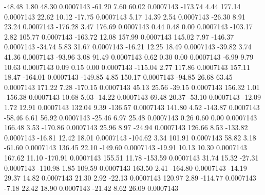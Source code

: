       -48.48        1.80       48.30     0.0007143
      -61.20        7.60       60.02     0.0007143
     -173.74        4.44      177.14     0.0007143
       22.62       10.12      -17.75     0.0007143
        5.17       14.39        2.54     0.0007143
      -26.30        8.91       23.24     0.0007143
     -176.28        3.47      176.69     0.0007143
        0.44        0.48        0.00     0.0007143
     -103.17        2.82      105.77     0.0007143
     -163.72       12.08      157.99     0.0007143
      145.02        7.97     -146.37     0.0007143
      -34.74        5.83       31.67     0.0007143
      -16.21       12.25       18.49     0.0007143
      -39.82        3.74       41.36     0.0007143
      -93.96        3.08       91.49     0.0007143
        0.62        0.30        0.00     0.0007143
       -6.99        9.79       10.63     0.0007143
        0.09        0.15        0.00     0.0007143
     -115.04        2.77      117.86     0.0007143
      157.11       18.47     -164.01     0.0007143
     -149.85        4.85      150.17     0.0007143
      -94.85       26.68       63.45     0.0007143
      171.22        7.28     -170.15     0.0007143
       45.13       25.56      -39.15     0.0007143
      156.32        1.01     -156.38     0.0007143
       10.68        5.03      -14.22     0.0007143
       69.48       20.37      -53.10     0.0007143
      -12.09        1.72       12.91     0.0007143
      132.04        9.39     -136.57     0.0007143
      141.80        4.52     -143.87     0.0007143
      -58.46        6.61       56.92     0.0007143
      -25.46        6.97       25.48     0.0007143
        0.26        0.60        0.00     0.0007143
      166.48        3.53     -170.86     0.0007143
       25.96        8.97      -24.94     0.0007143
      126.66        8.53     -133.82     0.0007143
      -16.81       12.42       18.01     0.0007143
     -104.62        3.34      101.91     0.0007143
       58.82        3.18      -61.60     0.0007143
      136.45       22.10     -149.60     0.0007143
      -19.91       10.13       10.30     0.0007143
      167.62       11.10     -170.91     0.0007143
      155.51       11.78     -153.59     0.0007143
       31.74       15.32      -27.31     0.0007143
     -110.98        1.85      109.59     0.0007143
      163.50        2.41     -164.80     0.0007143
      -14.19       29.37       14.82     0.0007143
       21.30        2.92      -22.13     0.0007143
      120.97        2.89     -114.77     0.0007143
       -7.18       22.42       18.90     0.0007143
      -21.42        8.62       26.09     0.0007143
